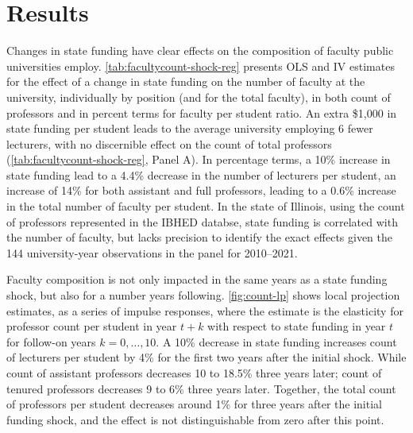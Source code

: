 \section{Results}
\label{sec:results}

Changes in state funding have clear effects on the composition of faculty public universities employ.
\autoref{tab:facultycount-shock-reg} presents OLS and IV estimates for the effect of a change in state funding on the number of faculty at the university, individually by position (and for the total faculty), in both count of professors and in percent terms for faculty per student ratio.
An extra \$1,000 in state funding per student leads to the average university employing 6 fewer lecturers, with no discernible effect on the count of total professors (\autoref{tab:facultycount-shock-reg}, Panel A).
In percentage terms, a 10\% increase in state funding lead to a 4.4\% decrease in the number of lecturers per student, an increase of 14\% for both assistant and full professors, leading to a 0.6\% increase in the total number of faculty per student.
In the state of Illinois, using the count of professors represented in the IBHED databse, state funding is correlated with the number of faculty, but lacks precision to identify the exact effects given the 144 university-year observations in the panel for 2010--2021.

Faculty composition is not only impacted in the same years as a state funding shock, but also for a number years following.
\autoref{fig:count-lp} shows local projection estimates, as a series of impulse responses, where the estimate is the elasticity for professor count per student in year $t+k$ with respect to state funding in year $t$ for follow-on years $k = 0, \hdots, 10$.
A 10\% decrease in state funding increases count of lecturers per student by 4\% for the first two years after the initial shock.
While count of assistant professors decreases 10 to 18.5\% three years later;
count of tenured professors decreases 9 to 6\% three years later.
Together, the total count of professors per student decreases around 1\% for three years after the initial funding shock, and the effect is not distinguishable from zero after this point.

